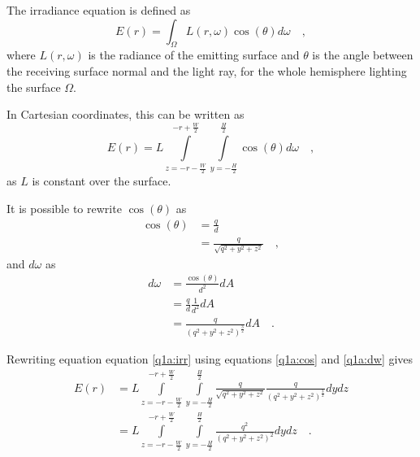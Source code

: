 \documentclass{report}
\begin{document}
The irradiance equation is defined as
\begin{equation}
E(r) = \int_{\Omega} L(r,\omega)\cos(\theta) d\omega
\quad,
\end{equation}
where $L(r,\omega)$ is the radiance of the emitting surface and $\theta$ is the angle between the receiving surface normal and the light ray, for the whole hemisphere lighting the surface $\Omega$.

In Cartesian coordinates, this can be written as
\begin{equation}
E(r) = L \int\limits_{z= -r - \frac{W}{2}}^{-r+\frac{W}{2}} \int\limits_{y= - \frac{H}{2}}^{\frac{H}{2}} \cos(\theta) d\omega
\quad,
\label{q1a:irr}
\end{equation}
as $L$ is constant over the surface.

It is possible to rewrite $\cos(\theta)$ as
\begin{align}
\cos(\theta)  &= \frac{q}{d} \\
              &= \frac{q}{\sqrt{q^2 + y^2 + z^2}}
\quad,
\label{q1a:cos}
\end{align}
and $d\omega$ as
\begin{align}
d\omega &= \frac{\cos(\theta)}{d^2} dA \\
        &= \frac{q}{d} \frac{1}{d^2} dA \\
        &= \frac{q}{\left(q^2 + y^2 + z^2\right)^\frac{3}{2}} dA
\quad.
\label{q1a:dw}
\end{align}

Rewriting equation equation \eqref{q1a:irr} using equations \eqref{q1a:cos} and \eqref{q1a:dw} gives
\begin{align}
E(r) &= L \int\limits_{z= -r - \frac{W}{2}}^{-r+\frac{W}{2}} \int\limits_{y= - \frac{H}{2}}^{\frac{H}{2}} \frac{q}{\sqrt{q^2 + y^2 + z^2}} \frac{q}{\left(q^2 + y^2 + z^2\right)^\frac{3}{2}} dydz \\
     &= L \int\limits_{z= -r - \frac{W}{2}}^{-r+\frac{W}{2}} \int\limits_{y= - \frac{H}{2}}^{\frac{H}{2}} \frac{q^2}{\left(q^2 + y^2 + z^2\right)^2} dydz 
\quad.
\label{q1a:eq}
\end{align}
\end{document}
